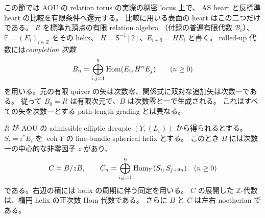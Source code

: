 この節では AOU の relation torus の実際の稠密 locus 上で、
AS heart と反標準 heart の比較を有限条件へ還元する。
比較に用いる表面の heart はこの二つだけである。
$R$ を標準九頂点の有限 relation algebra
（付録の普遍有限代数 $\mathscr B_b$）、
$\mathbb E=(E_i)_{i\in\mathbb Z}$ をその helix、
$H=\mathsf S^{-1}[2]$、$E_{i+9}=HE_i$ と書く。
rolled-up 代数には\emph{completion 次数}
\[
 B_n=\bigoplus_{i,j=1}^{9}\operatorname{Hom}(E_i,H^nE_j)\qquad(n\ge0)
\]
を用いる。元の有限 quiver の矢は次数零、関係式に双対な追加矢は次数一である。
従って $B_0=R$ は有限次元で、$B$ は次数零と一で生成される。
これはすべての矢を次数一とする path-length grading とは異なる。

\begin{lemma}
\label{lem:elliptic-helix-central-element}
$R$ が AOU の admissible elliptic decuple $(Y,(L_v))$ から得られるとする。
$S_i=\iota^*E_i$ を $\operatorname{coh}Y$ の line-bundle spherical helix とする。
このとき $B$ には次数一の中心的な非零因子 $z$ があり、
\[
 C=B/zB,\qquad
 C_n=\bigoplus_{i,j=1}^{9}\operatorname{Hom}_Y(S_i,S_{j+9n})\quad(n\ge0)
\]
である。右辺の積には helix の周期に伴う同定を用いる。
$C$ の展開した $\mathbb Z$-代数は、楕円 helix の正次数 Hom 代数である。
さらに $B$ と $C$ は左右 noetherian である。
\end{lemma}
